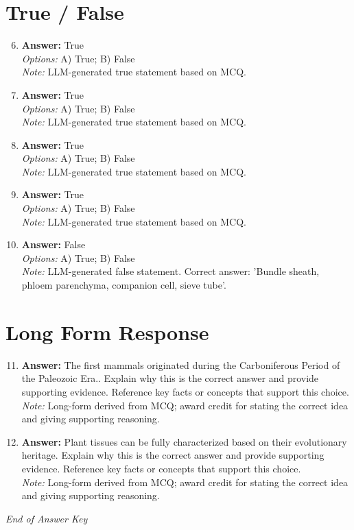 \documentclass[12pt]{article}
\begin{document}
\section*{True / False}
\begin{enumerate}[label=\arabic*.]
\setcounter{enumi}{5}
\item \textbf{Answer:} True
\\ \textit{Options:} A) True; B) False
\\ \textit{Note:} LLM-generated true statement based on MCQ.
\item \textbf{Answer:} True
\\ \textit{Options:} A) True; B) False
\\ \textit{Note:} LLM-generated true statement based on MCQ.
\item \textbf{Answer:} True
\\ \textit{Options:} A) True; B) False
\\ \textit{Note:} LLM-generated true statement based on MCQ.
\item \textbf{Answer:} True
\\ \textit{Options:} A) True; B) False
\\ \textit{Note:} LLM-generated true statement based on MCQ.
\item \textbf{Answer:} False
\\ \textit{Options:} A) True; B) False
\\ \textit{Note:} LLM-generated false statement. Correct answer: 'Bundle sheath, phloem parenchyma, companion cell, sieve tube'.
\end{enumerate}

\section*{Long Form Response}
\begin{enumerate}[label=\arabic*.]
\setcounter{enumi}{10}
\item \textbf{Answer:} The first mammals originated during the Carboniferous Period of the Paleozoic Era.. Explain why this is the correct answer and provide supporting evidence. Reference key facts or concepts that support this choice.
\\ \textit{Note:} Long-form derived from MCQ; award credit for stating the correct idea and giving supporting reasoning.
\item \textbf{Answer:} Plant tissues can be fully characterized based on their evolutionary heritage. Explain why this is the correct answer and provide supporting evidence. Reference key facts or concepts that support this choice.
\\ \textit{Note:} Long-form derived from MCQ; award credit for stating the correct idea and giving supporting reasoning.
\end{enumerate}

\vfill
\noindent\textit{End of Answer Key}
\end{document}
